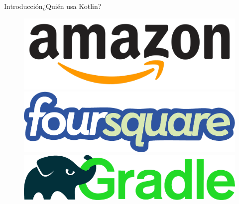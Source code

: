 \begin{frame}{Introducción}{¿Quién usa Kotlin?}
  \begin{figure}[!htb]
    \includegraphics[width=\linewidth]{images/introduction/amazon_logo}
  \endminipage\hfill
    \includegraphics[width=\linewidth]{images/introduction/foursquare_logo}
  \endminipage\hfill
    \includegraphics[width=\linewidth]{images/introduction/gradle_logo}
  \endminipage
  \end{figure}


\end{frame}
